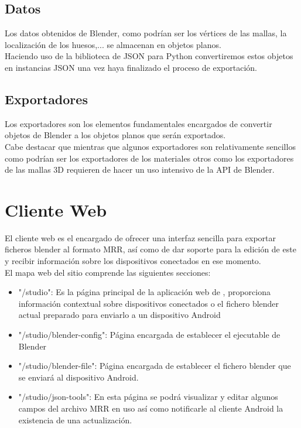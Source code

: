 \subsection{Datos}
Los datos obtenidos de Blender, como podrían ser los vértices de las mallas, la localización de los huesos,... se almacenan en objetos planos.\\
Haciendo uso de la biblioteca de JSON para Python convertiremos estos objetos en instancias JSON una vez haya finalizado el proceso de exportación.

\subsection{Exportadores}
Los exportadores son los elementos fundamentales encargados de convertir objetos de Blender a los objetos planos que serán exportados.\\
Cabe destacar que mientras que algunos exportadores son relativamente sencillos como podrían ser los exportadores de los materiales otros como los exportadores de las mallas 3D requieren de hacer un uso intensivo de la API de Blender.\\


\section{Cliente Web}
El cliente web es el encargado de ofrecer una interfaz sencilla para exportar ficheros blender al formato MRR, así como de dar soporte para la edición de este y recibir información sobre los dispositivos conectados en ese momento.\\

El mapa web del sitio comprende las siguientes secciones:
\begin{itemize}
\item "\slash studio": Es la página principal de la aplicación web de \studio, proporciona información contextual sobre dispositivos conectados o el fichero blender actual preparado para enviarlo a un dispositivo Android
\item "\slash studio/blender-config": Página encargada de establecer el ejecutable de Blender
\item "\slash studio/blender-file": Página encargada de establecer el fichero blender que se enviará al dispositivo Android.
\item "\slash studio/json-tools": En esta página se podrá visualizar y editar algunos campos del archivo MRR en uso así como notificarle al cliente Android la existencia de una actualización. 
\end{itemize}

